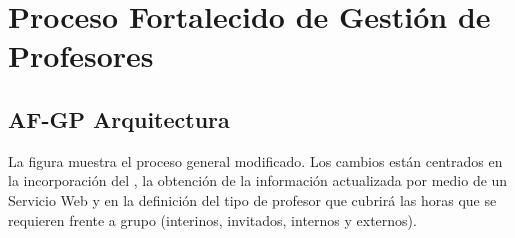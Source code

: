   \chapter{Proceso Fortalecido de Gestión de Profesores}
\hypertarget{chapter:PFGP}{}
\section{AF-GP Arquitectura}
%	
	La figura  muestra el proceso general modificado. Los cambios están centrados en la incorporación del , la obtención de la información actualizada por medio de un Servicio Web y en la definición del tipo de profesor que cubrirá las horas que se requieren frente a grupo (interinos, invitados, internos y externos).
	
